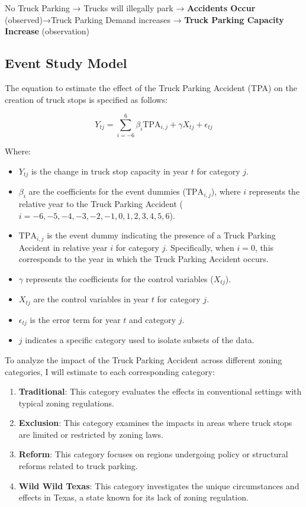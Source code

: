\documentclass[
  12pt]{article}
\providecommand{\tightlist}{%
  \setlength{\itemsep}{0pt}\setlength{\parskip}{0pt}}\usepackage{longtable,booktabs,array}
\begin{document}
No Truck Parking → Trucks will illegally park → \textbf{Accidents Occur}
(observed)→Truck Parking Demand increases → \textbf{Truck Parking
Capacity Increase} (observation)

\subsection{Event Study Model}\label{event-study-model}

The equation to estimate the effect of the Truck Parking Accident (TPA)
on the creation of truck stops is specified as follows:

\[
Y_{tj} = \sum_{i=-6}^{6} \beta_i \text{TPA}_{i,j} + \gamma X_{tj} + \epsilon_{tj}
\]

Where:

\begin{itemize}
\tightlist
\item
  \(Y_{tj}\) is the change in truck stop capacity in year \(t\) for
  category \(j\).
\item
  \(\beta_i\) are the coefficients for the event dummies
  (\(\text{TPA}_{i,j}\)), where \(i\) represents the relative year to
  the Truck Parking Accident
  (\(i = -6, -5, -4, -3, -2, -1, 0, 1, 2, 3, 4, 5, 6\)).
\item
  \(\text{TPA}_{i,j}\) is the event dummy indicating the presence of a
  Truck Parking Accident in relative year \(i\) for category \(j\).
  Specifically, when \(i = 0\), this corresponds to the year in which
  the Truck Parking Accident occurs.
\item
  \(\gamma\) represents the coefficients for the control variables
  (\(X_{tj}\)).
\item
  \(X_{tj}\) are the control variables in year \(t\) for category \(j\).
\item
  \(\epsilon_{tj}\) is the error term for year \(t\) and category \(j\).
\item
  \(j\) indicates a specific category used to isolate subsets of the
  data.
\end{itemize}

To analyze the impact of the Truck Parking Accident across different
zoning categories, I will estimate to each corresponding category:

\begin{enumerate}
\def\labelenumi{\arabic{enumi}.}
\item
  \textbf{Traditional}: This category evaluates the effects in
  conventional settings with typical zoning regulations.
\item
  \textbf{Exclusion}: This category examines the impacts in areas where
  truck stops are limited or restricted by zoning laws.
\item
  \textbf{Reform}: This category focuses on regions undergoing policy or
  structural reforms related to truck parking.
\item
  \textbf{Wild Wild Texas}: This category investigates the unique
  circumstances and effects in Texas, a state known for its lack of
  zoning regulation.
\end{enumerate}
\end{document}
